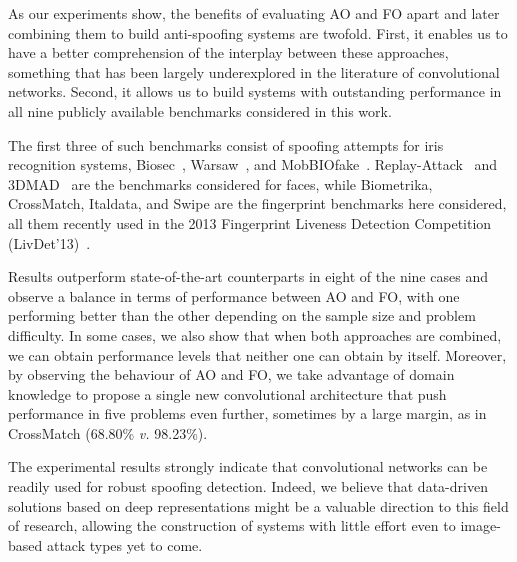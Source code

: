 As our experiments show, the benefits of evaluating AO and FO apart and later combining them to build anti-spoofing systems are twofold.
First, it enables us to have a better comprehension of the interplay between these approaches, something that has been largely underexplored in the literature of convolutional networks. Second, it allows us to build systems with outstanding performance in all nine publicly available benchmarks considered in this work.

The first three of such benchmarks consist of spoofing attempts for iris recognition systems, Biosec~\cite{Ruiz-Albacete:BIOID:2008}, Warsaw~\cite{Czajka:MMAR:2013}, and MobBIOfake~\cite{Sequeira:VISAPP:2014:base}.
Replay-Attack~\cite{Chingovska:BIOSEG:2012} and 3DMAD~\cite{Erdogmus:BTAS:2013} are the benchmarks considered for faces, while Biometrika, CrossMatch, Italdata, and Swipe are the fingerprint benchmarks here considered, all them recently used in the 2013 Fingerprint Liveness Detection Competition (LivDet'13)~\cite{Ghiani:ICB:2013}. 


Results outperform state-of-the-art counterparts in eight of the nine cases and observe a balance in terms of performance between AO and FO, with one performing better than the other depending on the sample size and problem difficulty. In some cases, we also show that when both approaches are combined, we can obtain performance levels that neither one can obtain by itself. Moreover, by observing the behaviour of AO and FO, we take advantage of domain knowledge to propose a single new convolutional architecture that push performance in five problems even further, sometimes by a large margin, as in CrossMatch (68.80\% \emph{v.} 98.23\%).  

The experimental results strongly indicate that convolutional networks can be readily used for robust spoofing detection.  
Indeed, we believe that data-driven solutions based on deep representations might be a valuable direction to this field of research, allowing the construction of systems with little effort even to image-based attack types yet to come.



